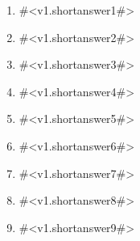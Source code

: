 \begin{enumerate}
\item
#<v1.shortanswer1#>
\item
#<v1.shortanswer2#>
\item
#<v1.shortanswer3#>
\item
#<v1.shortanswer4#>
\item
#<v1.shortanswer5#>
\item
#<v1.shortanswer6#>
\item
#<v1.shortanswer7#>
\item
#<v1.shortanswer8#> 
\item
#<v1.shortanswer9#> 

\end{enumerate}



